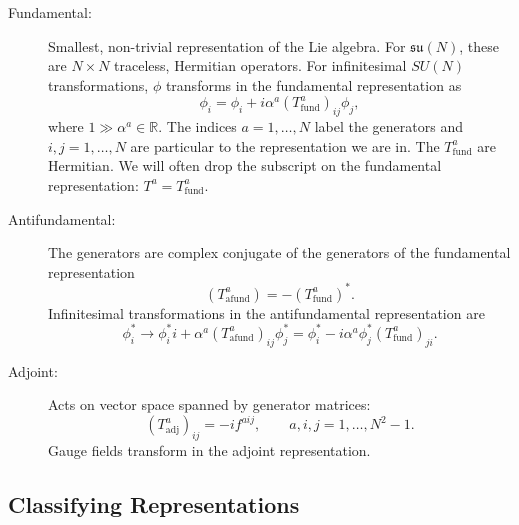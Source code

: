 \begin{description}
  \item[Fundamental:] Smallest, non-trivial representation of the Lie algebra.
    For $\mathfrak{su}(N)$, these are $N \times N$ traceless, Hermitian operators.
    For infinitesimal $SU(N)$ transformations, $\phi$ transforms in the fundamental representation as
    \begin{equation}
      \phi_i = \phi_i + i \alpha^{a} (T^{a} _{\text{fund}})_{ij} \phi_{j},
    \end{equation}
    where $1 \gg \alpha^{a} \in \mathbb{R}$. The indices $a = 1, \dots, N$ label the generators and $i, j = 1, \dots, N$ are particular to the representation we are in.
    The $T^{a} _{\text{fund}}$ are Hermitian.
    We will often drop the subscript on the fundamental representation: $T^{a} = T_{\text{fund}}^{a}$.
  \item[Antifundamental:] The generators are complex conjugate of the generators of the fundamental representation \begin{equation}(T^{a} _{\text{afund}}) = -(T_{\text{fund}}^{a})^*.\end{equation}
    Infinitesimal transformations in the antifundamental representation are
    \begin{equation}
      \phi_i^* \to \phi_i^* i + \alpha^{a} (T_{\text{afund}}^{a})_{ij} \phi^*_j = \phi_{i}^* - i \alpha^{a} \phi^*_j (T_{\text{fund}}^{a})_{ji}.
    \end{equation}
  \item[Adjoint:] Acts on vector space spanned by generator matrices:
    \begin{equation}
      (T_{\text{adj}}^{a})_{ij} = -i f^{aij}, \qquad a,i, j = 1, \dots, N^2 - 1.
    \end{equation}
    Gauge fields transform in the adjoint representation.
\end{description}

\subsection{Classifying Representations}%
\label{sub:classifying_representations}

